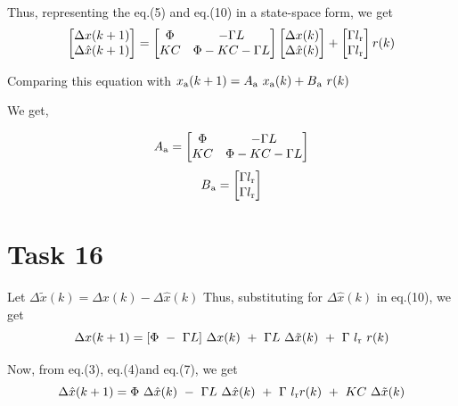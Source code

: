\documentclass[a4paper,12pt,oneside,onecolumn]{article} %
\begin{document}
Thus, representing the eq.(5) and eq.(10) in a state-space form, we get
\[
\begin{bmatrix}
  \Delta x(k+1) \\
 \Delta \hat{x}(k+1)
\end{bmatrix}
=
\begin{bmatrix}
 \Phi & -\Gamma L \\
K C & \Phi-K C-\Gamma L
\end{bmatrix}
\begin{bmatrix}
  \Delta x(k) \\
 \Delta \hat{x}(k)
\end{bmatrix}
+
\begin{bmatrix}
\Gamma l\textsubscript{r} \\
\Gamma l\textsubscript{r} 
\end{bmatrix}
r(k)
\]

Comparing this equation with $x\textsubscript{a}(k+1) = A\textsubscript{a} \ x\textsubscript{a}(k) + B\textsubscript{a} \ r(k)$

We get,

\[
A\textsubscript{a} = 
\begin{bmatrix}
\Phi & -\Gamma L \\
K C & \Phi-K C-\Gamma L
\end{bmatrix}
\]
\[
B\textsubscript{a} = 
\begin{bmatrix}
  \Gamma l\textsubscript{r} \\
\Gamma l\textsubscript{r} 
\end{bmatrix}
\]

\section*{Task 16}

Let $\Delta \tilde{x}(k) = \Delta x(k) - \Delta \hat{x}(k)$
 Thus, substituting for $\Delta \hat{x}(k)$ in eq.(10), we get 
\begin{equation}
\Delta x(k+1) = [\Phi \  - \ \Gamma L] \ \Delta  x(k)  \ + \  \Gamma L \ \Delta \tilde{x}(k) \ + \ \Gamma \ l\textsubscript{r} \  r(k) \\
\end{equation}

Now, from eq.(3), eq.(4)and eq.(7), we get
\begin{equation}
\Delta \hat{x}(k+1) = \Phi \ \Delta  \hat{x}(k) \ - \ \Gamma L \ \Delta \hat{x}(k) \ + \ \Gamma \ l\textsubscript{r} r(k) \ + \ K C \ \Delta \tilde{x}(k) \\
\end{equation}
\end{document}
